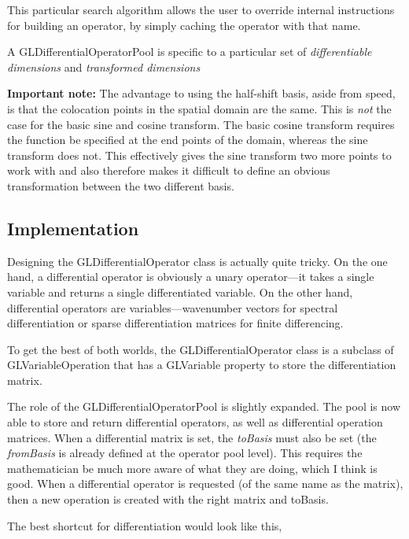 \documentclass[11pt]{article}
\begin{document}
This particular search algorithm allows the user to override internal instructions for building an operator, by simply caching the operator with that name.

A GLDifferentialOperatorPool is specific to a particular set of \emph{differentiable dimensions} and \emph{transformed dimensions}

\textbf{Important note:} The advantage to using the half-shift basis, aside from speed, is that the colocation points in the spatial domain are the same. This is \emph{not} the case for the basic sine and cosine transform. The basic cosine transform requires the function be specified at the end points of the domain, whereas the sine transform does not. This effectively gives the sine transform two more points to work with and also therefore makes it difficult to define an obvious transformation between the two different basis.

%
\subsection{Implementation}
%

Designing the GLDifferentialOperator class is actually quite tricky. On the one hand, a differential operator is obviously a unary operator---it takes a single variable and returns a single differentiated variable. On the other hand, differential operators are variables---wavenumber vectors for spectral differentiation or sparse differentiation matrices for finite differencing.

To get the best of both worlds, the GLDifferentialOperator class is a subclass of GLVariableOperation that has a GLVariable property to store the differentiation matrix.

The role of the GLDifferentialOperatorPool is slightly expanded. The pool is now able to store and return differential operators, as well as differential operation matrices. When a differential matrix is set, the \emph{toBasis} must also be set (the \emph{fromBasis} is already defined at the operator pool level). This requires the mathematician be much more aware of what they are doing, which I think is good. When a differential operator is requested (of the same name as the matrix), then a new operation is created with the right matrix and toBasis.

The best shortcut for differentiation would look like this,
\end{document}

